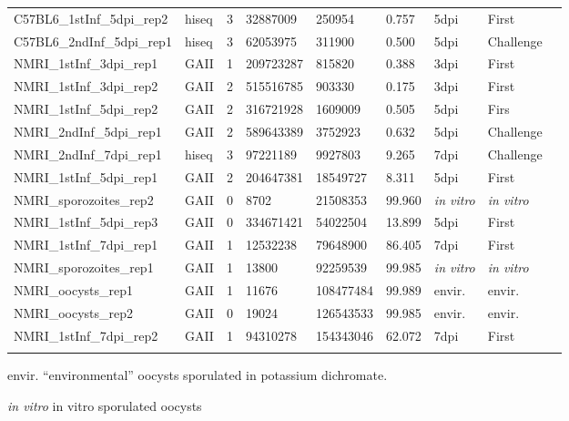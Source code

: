 \documentclass{bmcart}
\begin{document}
\begin{backmatter}
\begin{table}[ht]
\begin{tabular}{lllllllll}
  C57BL6\_1stInf\_5dpi\_rep2 & hiseq & 3 & 32887009 & 250954 & 0.757 & 5dpi & First \\ 
  C57BL6\_2ndInf\_5dpi\_rep1 & hiseq & 3 & 62053975 & 311900 & 0.500 & 5dpi & Challenge \\ 
  NMRI\_1stInf\_3dpi\_rep1 & GAII & 1 & 209723287 & 815820 & 0.388 & 3dpi & First \\ 
  NMRI\_1stInf\_3dpi\_rep2 & GAII & 2 & 515516785 & 903330 & 0.175 & 3dpi & First \\ 
  NMRI\_1stInf\_5dpi\_rep2 & GAII & 2 & 316721928 & 1609009 & 0.505 & 5dpi & Firs \\ 
  NMRI\_2ndInf\_5dpi\_rep1 & GAII & 2 & 589643389 & 3752923 & 0.632 & 5dpi & Challenge \\ 
  NMRI\_2ndInf\_7dpi\_rep1 & hiseq & 3 & 97221189 & 9927803 & 9.265 & 7dpi & Challenge \\ 
  NMRI\_1stInf\_5dpi\_rep1 & GAII & 2 & 204647381 & 18549727 & 8.311 & 5dpi & First \\ 
  NMRI\_sporozoites\_rep2 & GAII & 0 & 8702 & 21508353 & 99.960 & \textit{in vitro} & \textit{in vitro} \\ 
  NMRI\_1stInf\_5dpi\_rep3 & GAII & 0 & 334671421 & 54022504 & 13.899 & 5dpi & First \\ 
  NMRI\_1stInf\_7dpi\_rep1 & GAII & 1 & 12532238 & 79648900 & 86.405 & 7dpi & First \\ 
  NMRI\_sporozoites\_rep1 & GAII & 1 & 13800 & 92259539 & 99.985 & \textit{in vitro} & \textit{in vitro} \\ 
  NMRI\_oocysts\_rep1 & GAII & 1 & 11676 & 108477484 & 99.989 & envir. & envir. \\ 
  NMRI\_oocysts\_rep2 & GAII & 0 & 19024 & 126543533 & 99.985 & envir. & envir. \\ 
  NMRI\_1stInf\_7dpi\_rep2 & GAII & 1 & 94310278 & 154343046 & 62.072 & 7dpi & First \\ 
   \hline
\hspace*{+1.5cm}\end{tabular}
\begin{tablenotes}
  \small
\item *envir. ``environmental'' oocysts sporulated in potassium dichromate. \\
\item *\textit{in vitro} in vitro sporulated oocysts
\end{tablenotes}
\end{table}






\end{backmatter}
\end{document}
